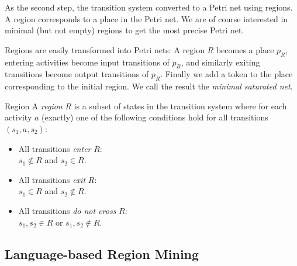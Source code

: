 \documentclass[english]{panikzettel}
\begin{document}
\begin{halfboxl}
As the second step, the transition system converted to a Petri net using regions.
A region corresponds to a place in the Petri net.
We are of course interested in minimal (but not empty) regions to get the most precise Petri net.

Regions are easily transformed into Petri nets: A region $R$ becomes a place $p_R$, entering activities become input transitions of $p_R$, and similarly exiting transitions become output transitions of $p_R$.
Finally we add a token to the place corresponding to the initial region.
We call the result the \emph{minimal saturated net}.
\end{halfboxl}%
\begin{halfboxr}
\vspace{-\baselineskip}
\begin{defi}{Region}
A \emph{region} $R$ is a subset of states in the transition system where for each activity $a$ (exactly) one of the following conditions hold for all transitions $(s_1, a, s_2)$:
\begin{itemize}
    \item All transitions \emph{enter} $R$: \\
          $s_1 \notin R$ and $s_2 \in R$.
    \item All transitions \emph{exit} $R$: \\
          $s_1 \in R$ and $s_2 \notin R$.
    \item All transitions \emph{do not cross} $R$: \\
          $s_1, s_2 \in R$ or $s_1, s_2 \notin R$.
\end{itemize}
\end{defi}
\end{halfboxr}

\subsection{Language-based Region Mining}
\end{document}
